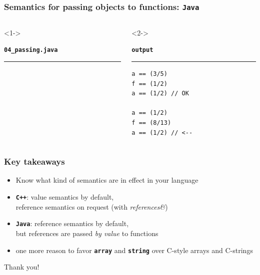 \documentclass[aspectratio=169]{beamer}
\newcommand{\greenemph}[1]{\textit{\textcolor{clGreen}{#1}}}
\newcommand{\cpp}[1]{\texttt{\textbf{\textcolor{clCodeBlue}{#1}}}}
\begin{document}
\begin{frame}[fragile]
\frametitle{Semantics for passing objects to functions: \cpp{Java}}
\begin{columns}[T]
  \begin{column}{0.7\textwidth}<1->
    {\color[HTML]{268bd2}
    \texttt{\textbf{04\_passing.java}}\vspace{-9pt}
    \rule{\linewidth}{2pt}}%
    {\fontsize{5}{5} }%
    \vspace{-12pt}{\color[HTML]{268bd2}\rule{\linewidth}{2pt}}%
  \end{column}
  \begin{column}{0.25\textwidth}<2->
    {\color[HTML]{002b36}
    \texttt{\textbf{output}}\vspace{-9pt}
    \rule{\linewidth}{2pt}}%
    {\fontsize{8}{6} \begin{lstlisting}[showstringspaces=false]
a == (3/5)
f == (1/2)
a == (1/2) // OK

a == (1/2)
f == (8/13)
a == (1/2) // <--
    \end{lstlisting}
    }
    \vspace{-12pt}{\color[HTML]{002b36}\rule{\linewidth}{2pt}}%
  \end{column}
\end{columns}
\end{frame}

\begin{frame}
\frametitle{Key takeaways}
{\centering
\begin{itemize}
  \item{} Know what kind of semantics are in effect in your language
  \item{} \cpp{C++}: value semantics by default,\\
                     reference semantics on request (with \textit{references\&})
  \item{} \cpp{Java}: reference semantics by default,\\
                     but references are passed \greenemph{by value} to functions
  \item{} one more reason to favor \cpp{array} and \cpp{string} over C-style arrays and C-strings
\end{itemize}

\vspace{2ex}
\begin{center}{\Large Thank you!}\end{center}
}
\end{frame}
\end{document}
